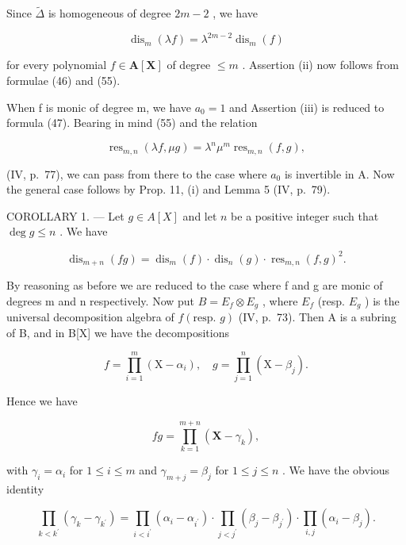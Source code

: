 Since \(\tilde{\Delta}\) is homogeneous of degree \(2m - 2\) , we have

\[
\operatorname{dis} _ {m} (\lambda f) = \lambda^ {2 m - 2} \operatorname{dis} _ {m} (f)\tag{55}
\]

for every polynomial \(f \in \mathbf{A}[\mathbf{X}]\) of degree \(\leqslant m\) . Assertion (ii) now follows from formulae (46) and (55).

When f is monic of degree m, we have \(a_{0} = 1\) and Assertion (iii) is reduced to formula (47). Bearing in mind (55) and the relation

\[
\operatorname{res} _ {m, n} (\lambda f, \mu g) = \lambda^ {n} \mu^ {m} \operatorname{res} _ {m, n} (f, g),\tag{56}
\]

(IV, p.~77), we can pass from there to the case where \(a_0\) is invertible in A. Now the general case follows by Prop. 11, (i) and Lemma 5 (IV, p.~79).

COROLLARY 1. --- Let \(g \in A[X]\) and let \(n\) be a positive integer such that \(\deg g \leqslant n\) . We have

\[
\operatorname{dis} _ {m + n} (f g) = \operatorname{dis} _ {m} (f) \cdot \operatorname{dis} _ {n} (g) \cdot \operatorname{res} _ {m, n} (f, g) ^ {2}.\tag{57}
\]

By reasoning as before we are reduced to the case where f and g are monic of degrees m and n respectively. Now put \(B = E_{f} \otimes E_{g}\) , where \(E_{f}\) (resp. \(E_{g}\) ) is the universal decomposition algebra of \(f(\text{resp. } g)\) (IV, p.~73). Then A is a subring of B, and in B{[}X{]} we have the decompositions

\[
f = \prod_ {i = 1} ^ {m} \left(\mathrm{X} - \alpha_ {i}\right), \quad g = \prod_ {j = 1} ^ {n} \left(\mathrm{X} - \beta_ {j}\right).
\]

Hence we have

\[
f g = \prod_ {k = 1} ^ {m + n} \left(\mathbf {X} - \gamma_ {k}\right),
\]

with \(\gamma_{i} = \alpha_{i}\) for \(1 \leqslant i \leqslant m\) and \(\gamma_{m + j} = \beta_{j}\) for \(1 \leqslant j \leqslant n\) . We have the obvious identity

\[
\prod_ {k <   k ^ {\prime}} \left(\gamma_ {k} - \gamma_ {k ^ {\prime}}\right) = \prod_ {i <   i ^ {\prime}} \left(\alpha_ {i} - \alpha_ {i ^ {\prime}}\right) \cdot \prod_ {j <   j ^ {\prime}} \left(\beta_ {j} - \beta_ {j ^ {\prime}}\right) \cdot \prod_ {i, j} \left(\alpha_ {i} - \beta_ {j}\right).
\]

